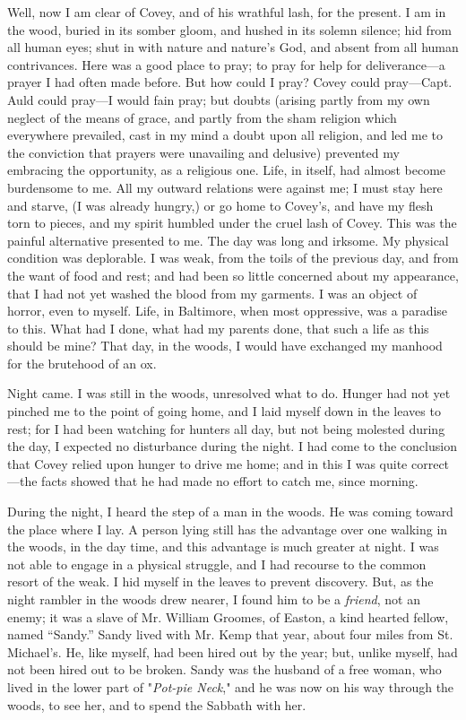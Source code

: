 Well, now I am clear of Covey, and of his wrathful lash, for the
present. I am in the wood, buried in its somber gloom, and hushed in its
solemn silence; hid from all human eyes; shut in with nature and
nature's God, and absent from all human contrivances. Here was a good
place to pray; to pray for help for deliverance---a prayer I had often
made before. But how could I pray? Covey could pray---Capt. Auld could
pray---I would fain pray; but doubts (arising {}partly from my own
neglect of the means of grace, and partly from the sham religion which
everywhere prevailed, cast in my mind a doubt upon all religion, and led
me to the conviction that prayers were unavailing and delusive)
prevented my embracing the opportunity, as a religious one. Life, in
itself, had almost become burdensome to me. All my outward relations
were against me; I must stay here and starve, (I was already hungry,) or
go home to Covey's, and have my flesh torn to pieces, and my spirit
humbled under the cruel lash of Covey. This was the painful alternative
presented to me. The day was long and irksome. My physical condition was
deplorable. I was weak, from the toils of the previous day, and from the
want of food and rest; and had been so little concerned about my
appearance, that I had not yet washed the blood from my garments. I was
an object of horror, even to myself. Life, in Baltimore, when most
oppressive, was a paradise to this. What had I done, what had my parents
done, that such a life as this should be mine? That day, in the woods, I
would have exchanged my manhood for the brutehood of an ox.

Night came. I was still in the woods, unresolved what to do. Hunger had
not yet pinched me to the point of going home, and I laid myself down in
the leaves to rest; for I had been watching for hunters all day, but not
being molested during the day, I expected no disturbance during the
night. I had come to the conclusion that Covey relied upon hunger to
drive me home; and in this I was quite correct---the {}facts showed that
he had made no effort to catch me, since morning.

During the night, I heard the step of a man in the woods. He was coming
toward the place where I lay. A person lying still has the advantage
over one walking in the woods, in the day time, and this advantage is
much greater at night. I was not able to engage in a physical struggle,
and I had recourse to the common resort of the weak. I hid myself in the
leaves to prevent discovery. But, as the night rambler in the woods drew
nearer, I found him to be a \emph{friend}, not an enemy; it was a slave
of Mr. William Groomes, of Easton, a kind hearted fellow, named
``Sandy.'' Sandy lived with Mr. Kemp that year, about four miles from
St. Michael's. He, like myself, had been hired out by the year; but,
unlike myself, had not been hired out to be broken. Sandy was the
husband of a free woman, who lived in the lower part of "\emph{Pot-pie
Neck}," and he was now on his way through the woods, to see her, and to
spend the Sabbath with her.

